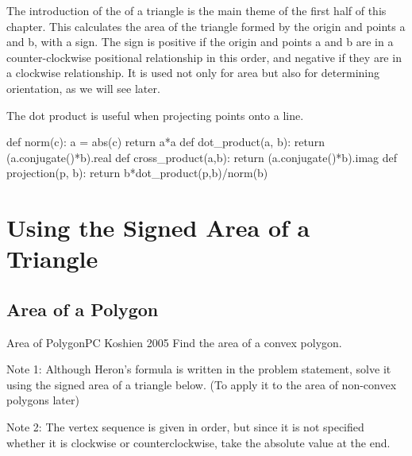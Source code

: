 The introduction of the  of a triangle is the main theme of the first half of this chapter. This calculates the area of the triangle formed by the origin and points a and b, with a sign. The sign is positive if the origin and points a and b are in a counter-clockwise positional relationship in this order, and negative if they are in a clockwise relationship. It is used not only for area but also for determining orientation, as we will see later.

The dot product is useful when projecting points onto a line.

\begin{pybox}[emph={cross_product,dot_product,projection,norm}]
def norm(c):
    a = abs(c)
    return a*a
def dot_product(a, b):
    return (a.conjugate()*b).real
def cross_product(a,b):
    return (a.conjugate()*b).imag
def projection(p, b):
    return b*dot_product(p,b)/norm(b)  
\end{pybox}
\section{Using the Signed Area of a Triangle}
\subsection{Area of a Polygon}
\begin{psbox}{Area of Polygon}{PC Koshien 2005}
  Find the area of a convex polygon.

Note 1: Although Heron's formula is written in the problem statement, solve it using the signed area of a triangle below. (To apply it to the area of non-convex polygons later)

Note 2: The vertex sequence is given in order, but since it is not specified whether it is clockwise or counterclockwise, take the absolute value at the end.

\end{psbox}

\begin{center}
\end{center}

